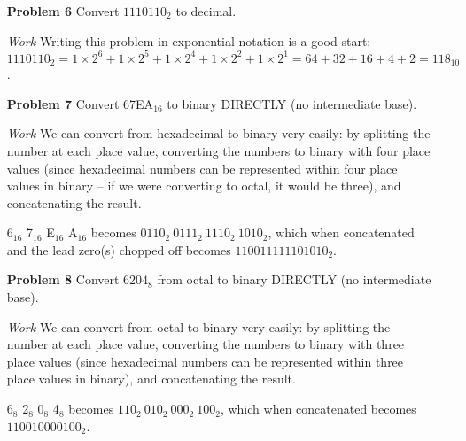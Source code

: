 \documentclass[12pt]{article}
\begin{document}
\begin{enumerate}
  \item[\textbf{Problem 6}] Convert $1110110_2$ to decimal.
\end{enumerate}

\begin{enumerate}
  \item[\textit{Work}] Writing this problem in exponential notation is a good start: $1110110_2 = 1\times2^6+1\times2^5+1\times2^4+1\times2^2+1\times2^1 = 64+32+16+4+2=118_{10}$.
\end{enumerate}


\begin{enumerate}
  \item[\textbf{Problem 7}] Convert 67EA$_{16}$ to binary DIRECTLY (no intermediate base).
\end{enumerate}

\begin{enumerate}
  \item[\textit{Work}] We can convert from hexadecimal to binary very easily: by splitting the number at each place value, converting the numbers to binary with four place values (since hexadecimal numbers can be represented within four place values in binary -- if we were converting to octal, it would be three), and concatenating the result.
  \item[] 6$_{16}$ 7$_{16}$ E$_{16}$ A$_{16}$ becomes $0110_2\ 0111_2\ 1110_2\ 1010_2$, which when concatenated and the lead zero(s) chopped off becomes $110011111101010_2$.
\end{enumerate}


\begin{enumerate}
  \item[\textbf{Problem 8}] Convert $6204_8$ from octal to binary DIRECTLY (no intermediate base).
\end{enumerate}

\begin{enumerate}
  \item[\textit{Work}] We can convert from octal to binary very easily: by splitting the number at each place value, converting the numbers to binary with three place values (since hexadecimal numbers can be represented within three place values in binary), and concatenating the result.
  \item[] 6$_8$ 2$_8$ 0$_8$ 4$_8$ becomes $110_2\ 010_2\ 000_2\ 100_2$, which when concatenated becomes $110010000100_2$.
\end{enumerate}
\end{document}
